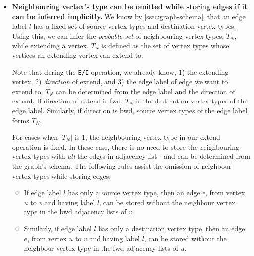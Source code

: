 \begin{itemize}
	\item \textbf{Neighbouring vertex's type can be omitted while storing edges if it can be inferred implicitly.} We know by \ref{ssec:graph-schema}, that an edge label $l$ has a fixed set of source vertex types and destination vertex types. Using this, we can infer the \emph{probable set} of neighbouring vertex types, $T_N$, while extending a vertex. $T_N$ is defined as the set of vertex types whose vertices an extending vertex can extend to.

	Note that during the \texttt{E/I} operation, we already know, 1) the extending vertex, 2) \emph{direction} of extend, and 3) the edge label of edge we want to extend to. $T_N$ can be determined from the edge label and the direction of extend. If direction of extend is \gls{fwd}, $T_N$ is the destination vertex types of the edge label. Similarly, if direction is \gls{bwd}, source vertex types of the edge label forms $T_N$. 
	
	For cases when $|T_N|$ is $1$, the neighbouring vertex type in our extend operation is fixed. In these case, there is no need to store the neighbouring vertex types with \emph{all} the edges in adjacency list - and can be determined from the graph's schema. The following rules assist the omission of neighbour vertex types while storing edges:
	
	\begin{itemize}
		\item If edge label $l$ has only a source vertex type, then an edge $e$, from vertex $u$ to $v$ and having label $l$, can be stored without the neighbour vertex type in the \gls{bwd} adjacency lists of $v$.
		
		\item Similarly, if edge label $l$ has only a destination vertex type, then an edge $e$, from vertex $u$ to $v$ and having label $l$, can be stored without the neighbour vertex type in the \gls{fwd} adjacency lists of $u$.
	\end{itemize}


\end{itemize}
